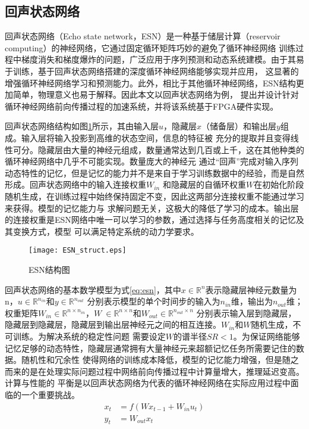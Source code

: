 \subsection{回声状态网络}
回声状态网络（Echo state network，ESN）是一种基于储层计算（reservoir computing）的神经网络，它通过固定循环矩阵巧妙的避免了循环神经网络
训练过程中梯度消失和梯度爆炸的问题，广泛应用于序列预测和动态系统建模。由于其易于训练，基于回声状态网络搭建的深度循环神经网络能够实现并应用，
这显著的增强循环神经网络学习和预测能力。此外，相比于其他循环神经网络，ESN结构更加简单，物理意义也易于解释。因此本文以回声状态网络为例，
提出并设计针对循环神经网络前向传播过程的加速系统，并将该系统基于FPGA硬件实现。

回声状态网络结构如图\ref{fig:esn}所示，其由输入层\(u\)，隐藏层\(x\)（储备层）和输出层\(y\)组成。输入层将输入投影到高维的状态空间，信息的特征被
充分的提取并且变得线性可分。隐藏层由大量的神经元组成，数量通常达到几百或上千，这在其他种类的循环神经网络中几乎不可能实现。数量庞大的神经元
通过“回声”完成对输入序列动态特性的记忆，但是记忆的能力并不是来自于学习训练数据中的经验，而是自然形成。回声状态网络中的输入连接权重\(W_{in}\)
和隐藏层的自循环权重\(W\)在初始化阶段随机生成，在训练过程中始终保持固定不变，因此这两部分连接权重不能通过学习来获得。模型的记忆能力与
求解问题无关，这极大的降低了学习的成本。输出层的连接权重是ESN网络中唯一可以学习的参数，通过选择与任务高度相关的记忆及其变换方式，模型
可以满足特定系统的动力学要求。

\begin{figure}
	\centering
	\texttt{[image: ESN\_struct.eps]}
	\caption{ESN结构图}
	\label{fig:esn}
\end{figure}

回声状态网络的基本数学模型为式\ref{eq:esn}，其中\(x\in \mathbb{R}^n\)表示隐藏层神经元数量为n，\(u \in \mathbb{R}^{n_{in}}\)和\(y \in \mathbb{R}^{n_{out}}\)
分别表示模型的单个时间步的输入为\(n_{in}\)维，输出为\(n_{out}\)维；权重矩阵\(W_{in} \in \mathbb{R}^{n \times n_{in}}\)，\(W\ \in \mathbb{R}^{n \times n}\)和\(W_{out} \in \mathbb{R}^{n_{out} \times n}\)
分别表示输入层到隐藏层，隐藏层到隐藏层，隐藏层到输出层神经元之间的相互连接。\(W_{in}\)和\(W\)随机生成，不可训练。为解决系统的稳定性问题
需要设定\(W\)的谱半径\(SR < 1\)。为保证网络能够记忆足够的动态特性，隐藏层通常拥有大量神经元来超额记忆任务所需要记住的数据。随机性和冗余性
使得网络的训练成本降低，模型的记忆能力增强，但是随之而来的是在处理实际问题过程中网络前向传播过程中计算量增大，推理延迟变高。计算与性能的
平衡是以回声状态网络为代表的循环神经网络在实际应用过程中面临的一个重要挑战。
\begin{equation}\label{eq:esn}
	\begin{split}
		x_{t} &= f(W x_{t-1} + W_{in} u_{t})	\\
		y_{t} &= W_{out} x_{t}				
	\end{split}
\end{equation}

